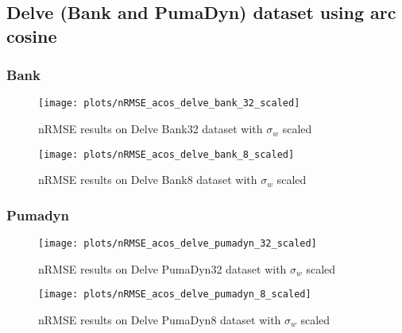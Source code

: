 \subsection{Delve (Bank and PumaDyn) dataset using arc cosine}


\subsubsection{Bank}

\begin{figure}[H]
    \texttt{[image: plots/nRMSE\_acos\_delve\_bank\_32\_scaled]}
    \caption{nRMSE results on Delve Bank32 dataset with $\sigma_w$ scaled}
    \label{fig:nrmse-acos-delve-bank-32-scaled}
\end{figure}

\begin{figure}[H]
    \texttt{[image: plots/nRMSE\_acos\_delve\_bank\_8\_scaled]}
    \caption{nRMSE results on Delve Bank8 dataset with $\sigma_w$ scaled}
    \label{fig:nrmse-acos-delve-bank-8-scaled}
\end{figure}

\subsubsection{Pumadyn}

\begin{figure}[H]
    \texttt{[image: plots/nRMSE\_acos\_delve\_pumadyn\_32\_scaled]}
    \caption{nRMSE results on Delve PumaDyn32 dataset with $\sigma_w$ scaled}
    \label{fig:nrmse-acos-delve-pumadyn-32-scaled}
\end{figure}

\begin{figure}[H]
    \texttt{[image: plots/nRMSE\_acos\_delve\_pumadyn\_8\_scaled]}
    \caption{nRMSE results on Delve PumaDyn8 dataset with $\sigma_w$ scaled}
    \label{fig:nrmse-acos-delve-pumadyn-8-scaled}
\end{figure}

%
%
%

